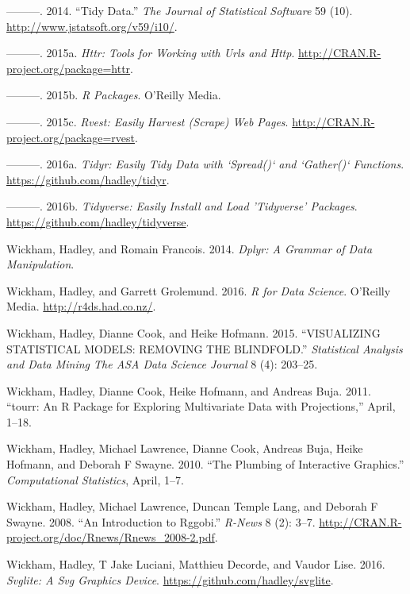 \documentclass[12pt,]{isuthesis}
\begin{document}
\hypertarget{ref-tidy-data}{}
---------. 2014. ``Tidy Data.'' \emph{The Journal of Statistical
Software} 59 (10). \url{http://www.jstatsoft.org/v59/i10/}.

\hypertarget{ref-httr}{}
---------. 2015a. \emph{Httr: Tools for Working with Urls and Http}.
\url{http://CRAN.R-project.org/package=httr}.

\hypertarget{ref-rpkgs}{}
---------. 2015b. \emph{R Packages}. O'Reilly Media.

\hypertarget{ref-rvest}{}
---------. 2015c. \emph{Rvest: Easily Harvest (Scrape) Web Pages}.
\url{http://CRAN.R-project.org/package=rvest}.

\hypertarget{ref-tidyr}{}
---------. 2016a. \emph{Tidyr: Easily Tidy Data with `Spread()` and
`Gather()` Functions}. \url{https://github.com/hadley/tidyr}.

\hypertarget{ref-tidyverse}{}
---------. 2016b. \emph{Tidyverse: Easily Install and Load 'Tidyverse'
Packages}. \url{https://github.com/hadley/tidyverse}.

\hypertarget{ref-dplyr}{}
Wickham, Hadley, and Romain Francois. 2014. \emph{Dplyr: A Grammar of
Data Manipulation}.

\hypertarget{ref-r4ds}{}
Wickham, Hadley, and Garrett Grolemund. 2016. \emph{R for Data Science}.
O'Reilly Media. \url{http://r4ds.had.co.nz/}.

\hypertarget{ref-Wickham:2015ur}{}
Wickham, Hadley, Dianne Cook, and Heike Hofmann. 2015. ``VISUALIZING
STATISTICAL MODELS: REMOVING THE BLINDFOLD.'' \emph{Statistical Analysis
and Data Mining The ASA Data Science Journal} 8 (4): 203--25.

\hypertarget{ref-tourr}{}
Wickham, Hadley, Dianne Cook, Heike Hofmann, and Andreas Buja. 2011.
``tourr: An R Package for Exploring Multivariate Data with
Projections,'' April, 1--18.

\hypertarget{ref-plumbing}{}
Wickham, Hadley, Michael Lawrence, Dianne Cook, Andreas Buja, Heike
Hofmann, and Deborah F Swayne. 2010. ``The Plumbing of Interactive
Graphics.'' \emph{Computational Statistics}, April, 1--7.

\hypertarget{ref-rggobi}{}
Wickham, Hadley, Michael Lawrence, Duncan Temple Lang, and Deborah F
Swayne. 2008. ``An Introduction to Rggobi.'' \emph{R-News} 8 (2): 3--7.
\url{http://CRAN.R-project.org/doc/Rnews/Rnews_2008-2.pdf}.

\hypertarget{ref-svglite}{}
Wickham, Hadley, T Jake Luciani, Matthieu Decorde, and Vaudor Lise.
2016. \emph{Svglite: A Svg Graphics Device}.
\url{https://github.com/hadley/svglite}.
\end{document}

